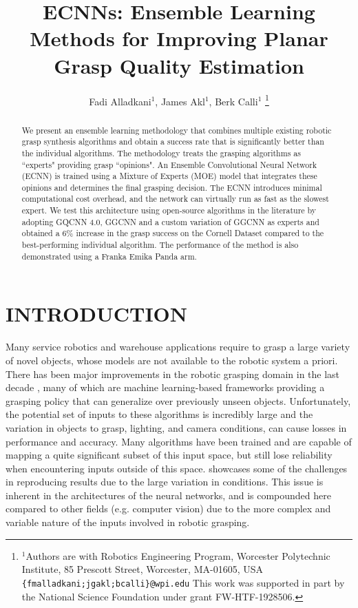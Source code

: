 \documentclass[letterpaper, 10 pt, conference]{ieeeconf}
\title{\LARGE \bf
ECNNs: Ensemble Learning Methods for Improving Planar Grasp Quality Estimation
}
\author{Fadi Alladkani$^{1}$, James Akl$^{1}$, Berk Calli$^{1}$
\thanks{$^{1}$Authors are with Robotics Engineering Program, Worcester Polytechnic Institute, 85 Prescott Street, Worcester, MA-01605, USA
        {\tt\small \{fmalladkani;jgakl;bcalli\}@wpi.edu}
        This work was supported in part by the National Science Foundation under grant FW-HTF-1928506.
        }
}
\begin{document}
\maketitle
\thispagestyle{empty}
\pagestyle{empty}


\begin{abstract}
We present an ensemble learning methodology that combines multiple existing robotic grasp synthesis algorithms and obtain a success rate that is significantly better than the individual algorithms. The methodology treats the grasping algorithms as ``experts" providing grasp ``opinions". An Ensemble Convolutional Neural Network (ECNN) is trained using a Mixture of Experts (MOE) model that integrates these opinions and determines the final grasping decision.  The ECNN introduces minimal computational cost overhead, and the network can virtually run as fast as the slowest expert. We test this architecture using open-source algorithms in the literature by adopting GQCNN 4.0, GGCNN and a custom variation of GGCNN as experts and obtained a 6\% increase in the grasp success on the Cornell Dataset compared to the best-performing individual algorithm. The performance of the method is also demonstrated using a Franka Emika Panda arm.

\end{abstract}


\section{INTRODUCTION}

Many service robotics and warehouse applications require to grasp a large variety of novel objects, whose models are not available to the robotic system a priori. There has been major improvements in the robotic grasping domain in the last decade \cite{dexnet2, generative, newGenerative, earlyGrasping, multigrasp}, many of which are machine learning-based frameworks providing a grasping policy that can generalize over previously unseen objects. Unfortunately, the potential set of inputs to these algorithms is incredibly large and the variation in objects to grasp, lighting, and camera conditions, can cause losses in performance and accuracy.  Many algorithms have been trained and are capable of mapping a quite significant subset of this input space, but still lose reliability when encountering inputs outside of this space. \cite{DifficultiesInBenchmarking} showcases some of the challenges in reproducing results due to the large variation in conditions. This issue is inherent in the architectures of the neural networks, and is compounded here compared to other fields (e.g. computer vision) due to the more complex and variable nature of the inputs involved in robotic grasping.
\end{document}
